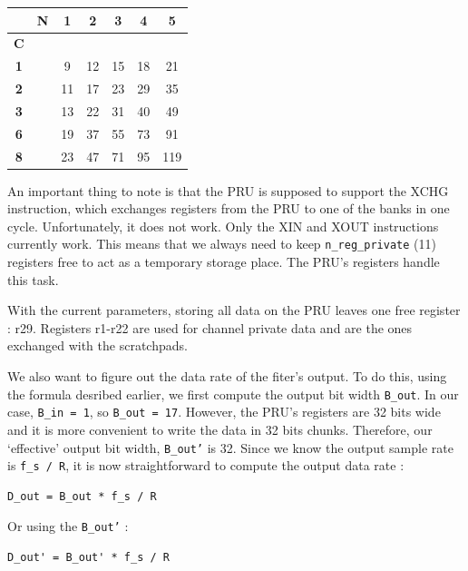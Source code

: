 \documentclass[]{report}
\begin{document}
\begin {table}[H]
\begin{center}
\begin{tabular}{|c|c|c|c|c|c|c|}
	\hline  & \textbf{N} & \textbf{1} & \textbf{2} & \textbf{3} & \textbf{4} & \textbf{5} \\ 
	\hline \textbf{C} & & & & & & \\ 
	\hline  \textbf{1} & & 9 & 12 & 15 & 18 & 21 \\ 
	\hline \textbf{2} & & 11 & 17 & 23 & 29 & 35 \\ 
	\hline  \textbf{3} & & 13 & 22 & 31 & 40 & 49  \\ 
	\hline \textbf{6} & & 19 & 37 & 55 & 73 & 91 \\ 
	\hline \textbf{8} & & 23 & 47 & 71 & 95 & 119  \\ 
	\hline 
\end{tabular} 
\end{center}
\end {table}


An important thing to note is that the PRU is supposed to support the
XCHG instruction, which exchanges registers from the PRU to one of the
banks in one cycle. Unfortunately, it does not work. Only the XIN and
XOUT instructions currently work. This means that we always need to keep
\texttt{n\_reg\_private} (11) registers free to act as a temporary
storage place. The PRU's registers handle this task.

With the current parameters, storing all data on the PRU leaves one free
register : r29. Registers r1-r22 are used for channel private data and
are the ones exchanged with the scratchpads.

We also want to figure out the data rate of the fiter's output. To do
this, using the formula desribed earlier, we first compute the output
bit width \texttt{B\_out}. In our case, \texttt{B\_in\ =\ 1}, so
\texttt{B\_out\ =\ 17}. However, the PRU's registers are 32 bits wide
and it is more convenient to write the data in 32 bits chunks.
Therefore, our `effective' output bit width,
\texttt{B\_out'} is 32. Since we know the output sample
rate is \texttt{f\_s\ /\ R}, it is now straightforward to compute the
output data rate :

\begin{verbatim}
D_out = B_out * f_s / R
\end{verbatim}

\noindent Or using the \texttt{B\_out'} :

\begin{verbatim}
D_out' = B_out' * f_s / R
\end{verbatim}
\end{document}
